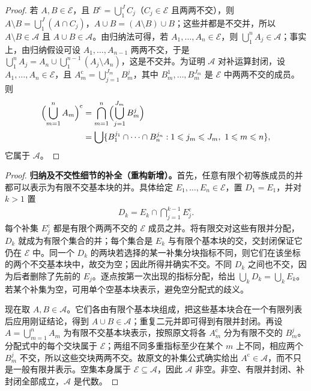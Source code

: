 \documentclass[../../main.tex]{subfiles}%
\begin{document}
\begin{proof}
若 $A,B\in\mathscr{E}$，且 $B^{\mathrm{c}}=\bigcup_1^JC_j$（$C_j\in\mathscr{E}$ 且两两不交），则 $A\setminus B=\bigcup_1^J(A\cap C_j)$，$A\cup B=(A\setminus B)\cup B$；这些并都是不交并，所以 $A\setminus B\in\mathscr{A}$ 且 $A\cup B\in\mathscr{A}$。由归纳法可得，若 $A_1,\ldots,A_n\in\mathscr{E}$，则 $\bigcup_1^nA_j\in\mathscr{A}$；事实上，由归纳假设可设 $A_1,\ldots,A_{n-1}$ 两两不交，于是 $\bigcup_1^nA_j=A_n\cup\bigcup_1^{n-1}(A_j\setminus A_n)$，这是不交并。为证明 $\mathscr{A}$ 对补运算封闭，设 $A_1,\ldots,A_n\in\mathscr{E}$，且 $A_m^{\mathrm{c}}=\bigcup_{j=1}^{J_m}B_m^j$，其中 $B_m^1,\ldots,B_m^{J_m}$ 是 $\mathscr{E}$ 中两两不交的成员。则
\begin{align*}
\Bigl(\bigcup_{m=1}^nA_m\Bigr)^{\mathrm{c}}
&=\bigcap_{m=1}^n\Bigl(\bigcup_{j=1}^{J_m}B_m^j\Bigr)\\
&=\bigcup\{B_1^{j_1}\cap\cdots\cap B_n^{j_n}:1\leqslant j_m\leqslant J_m,\ 1\leqslant m\leqslant n\},
\end{align*}
它属于 $\mathscr{A}$。
\end{proof}
\begin{proof}
\textbf{归纳及不交性细节的补全（重构新增）。}首先，任意有限个初等族成员的并都可以表示为有限不交基本块的并。具体给定 $E_1,\ldots,E_n\in\mathscr{E}$，置 $D_1=E_1$，并对 $k>1$ 置
\begin{align*}
D_k=E_k\cap\bigcap_{j=1}^{k-1}E_j^{\mathrm c}.
\end{align*}
每个补集 $E_j^{\mathrm c}$ 都是有限个两两不交的 $\mathscr{E}$ 成员之并。将有限交对这些有限并分配，$D_k$ 就成为有限个集合的并；每个集合是 $E_k$ 与有限个基本块的交，交封闭保证它仍在 $\mathscr{E}$ 中。同一个 $D_k$ 的两块若选择的某一补集分块指标不同，则它们在该坐标的两个不交基本块中，故交为空；因此所得并确实不交。不同 $D_k$ 之间也不交，因为后者删除了先前的 $E_j$。逐点按第一次出现的指标分配，给出 $\bigcup_kD_k=\bigcup_kE_k$。若某个补集为空，可用单个空基本块表示，避免空分配式的歧义。

现在取 $A,B\in\mathscr{A}$。它们各由有限个基本块组成，把这些基本块合在一个有限列表后应用刚证结论，得到 $A\cup B\in\mathscr{A}$；重复二元并即可得到有限并封闭。再设 $A=\bigcup_{m=1}^nA_m$ 为有限不交基本块表示，按照原文将各 $A_m^{\mathrm c}$ 分为有限不交的 $B_m^j$。分配式中的每个交块属于 $\mathscr{E}$；两组不同多重指标至少在某个 $m$ 上不同，相应两个 $B_m^j$ 不交，所以这些交块两两不交。故原文的补集公式确实给出 $A^{\mathrm c}\in\mathscr{A}$，而不只是一般有限并表示。空集本身属于 $\mathscr{E}\subseteq\mathscr{A}$，因此 $\mathscr{A}$ 非空。非空、有限并封闭、补封闭全部成立，$\mathscr{A}$ 是代数。
\end{proof}
\end{document}
